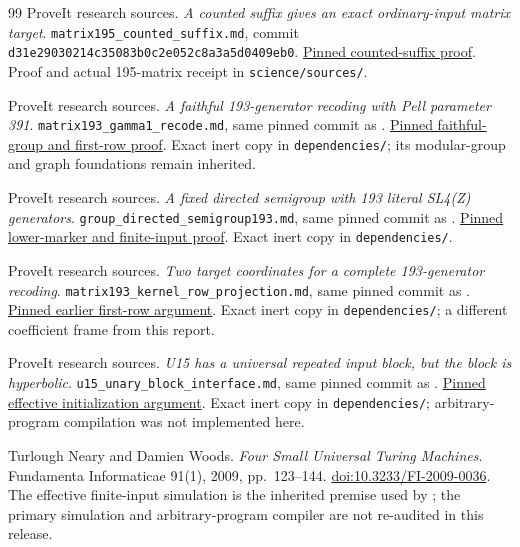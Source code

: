 \documentclass[11pt,letterpaper]{article}
\theoremstyle{definition}
\theoremstyle{remark}
\begin{document}
\begin{thebibliography}{99}
ProveIt research sources. \emph{A counted suffix gives an exact ordinary-input matrix target}. \texttt{matrix195\_counted\_suffix.md}, commit \texttt{d31e29030214c35083b0c2e052c8a3a5d0409eb0}. \href{https://github.com/VladimirReshetnikov/ProveIt/blob/d31e29030214c35083b0c2e052c8a3a5d0409eb0/Computability/HilbertTenthProblem/Papers/research-wip/native-stream-queue/matrix195_counted_suffix.md}{Pinned counted-suffix proof}. Proof and actual 195-matrix receipt in \texttt{science/sources/}.

ProveIt research sources. \emph{A faithful 193-generator recoding with Pell parameter 391}. \texttt{matrix193\_gamma1\_recode.md}, same pinned commit as \cite{cm-countdown}. \href{https://github.com/VladimirReshetnikov/ProveIt/blob/750aeb4f7834332deb2bec5f32fb470ff8254431/Computability/HilbertTenthProblem/Papers/research-wip/native-stream-queue/matrix193_gamma1_recode.md}{Pinned faithful-group and first-row proof}. Exact inert copy in \texttt{dependencies/}; its modular-group and graph foundations remain inherited.

ProveIt research sources. \emph{A fixed directed semigroup with 193 literal SL4(Z) generators}. \texttt{group\_directed\_semigroup193.md}, same pinned commit as \cite{cm-countdown}. \href{https://github.com/VladimirReshetnikov/ProveIt/blob/750aeb4f7834332deb2bec5f32fb470ff8254431/Computability/HilbertTenthProblem/Papers/research-wip/native-stream-queue/group_directed_semigroup193.md}{Pinned lower-marker and finite-input proof}. Exact inert copy in \texttt{dependencies/}.

ProveIt research sources. \emph{Two target coordinates for a complete 193-generator recoding}. \texttt{matrix193\_kernel\_row\_projection.md}, same pinned commit as \cite{cm-countdown}. \href{https://github.com/VladimirReshetnikov/ProveIt/blob/750aeb4f7834332deb2bec5f32fb470ff8254431/Computability/HilbertTenthProblem/Papers/research-wip/native-stream-queue/matrix193_kernel_row_projection.md}{Pinned earlier first-row argument}. Exact inert copy in \texttt{dependencies/}; a different coefficient frame from this report.

ProveIt research sources. \emph{U15 has a universal repeated input block, but the block is hyperbolic}. \texttt{u15\_unary\_block\_interface.md}, same pinned commit as \cite{cm-countdown}. \href{https://github.com/VladimirReshetnikov/ProveIt/blob/750aeb4f7834332deb2bec5f32fb470ff8254431/Computability/HilbertTenthProblem/Papers/research-wip/native-stream-queue/u15_unary_block_interface.md}{Pinned effective initialization argument}. Exact inert copy in \texttt{dependencies/}; arbitrary-program compilation was not implemented here.

Turlough Neary and Damien Woods. \emph{Four Small Universal Turing Machines}. Fundamenta Informaticae 91(1), 2009, pp.\ 123--144. \href{https://doi.org/10.3233/FI-2009-0036}{doi:10.3233/FI-2009-0036}. The effective finite-input simulation is the inherited premise used by \cite{cm-unary}; the primary simulation and arbitrary-program compiler are not re-audited in this release.
\end{thebibliography}
\end{document}
